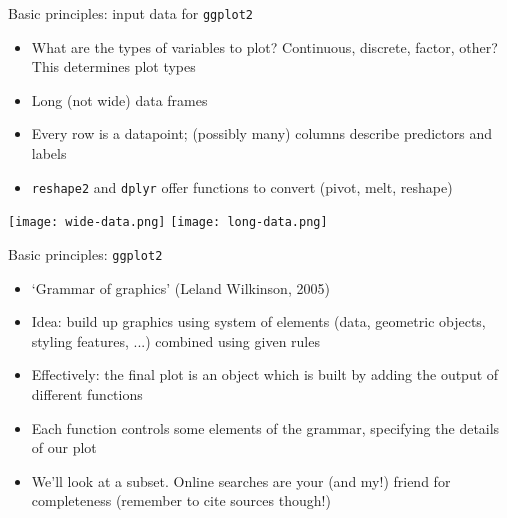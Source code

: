 \documentclass[10pt]{beamer}
\begin{document}
\begin{frame}{Basic principles: input data for \texttt{ggplot2}}
  \begin{itemize}
        \item What are the types of variables to plot? Continuous, discrete, factor, other? This determines plot types
    \item Long (not wide) data frames
      \item Every row is a datapoint; (possibly many) columns describe predictors and labels
    \item \texttt{reshape2} and \texttt{dplyr} offer functions to convert (pivot, melt, reshape)
    \end{itemize}
    \texttt{[image: wide-data.png]}     \texttt{[image: long-data.png]} \\
\end{frame}

\begin{frame}{Basic principles: \texttt{ggplot2}}
    \begin{itemize}
    \item `Grammar of graphics' (Leland Wilkinson, 2005)
    \item Idea: build up graphics using system of elements (data, geometric objects, styling features, ...) combined using given rules
    \item Effectively: the final plot is an object which is built by adding the output of different functions
    \item Each function controls some elements of the grammar, specifying the details of our plot
      \item We'll look at a subset. Online searches are your (and my!) friend for completeness (remember to cite sources though!)
    \end{itemize}
\end{frame}
\end{document}

